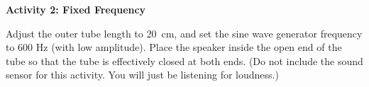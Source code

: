 



\textbf{Activity 2: Fixed Frequency} 

Adjust the outer tube length to 20~cm, and set the sine wave generator frequency to 600 Hz (with low amplitude).
Place the speaker inside the open end of the tube so that the tube is effectively closed at both ends. (Do not include the sound sensor for this activity. You will just be listening for loudness.)

